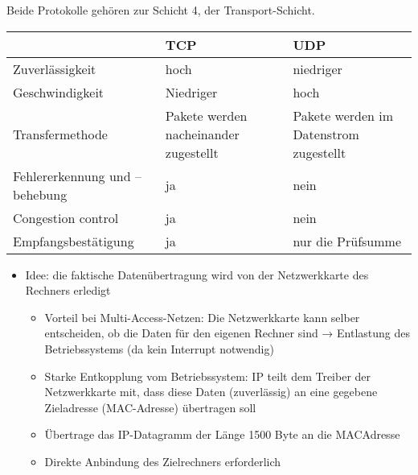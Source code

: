 Beide Protokolle gehören zur Schicht 4, der Transport-Schicht.
\bigbreak
\begin{tabularx}{\textwidth}{|X|X|X|}
    \hline
    & TCP & UDP \tabularnewline
    \hline
    Zuverlässigkeit & hoch & niedriger \tabularnewline
    \hline
    Geschwindigkeit & Niedriger & hoch \tabularnewline
    \hline
    Transfermethode & Pakete werden nacheinander zugestellt & Pakete werden im Datenstrom zugestellt \tabularnewline
    \hline
    Fehlererkennung und – behebung & ja & nein \tabularnewline
    \hline
    Congestion control & ja & nein \tabularnewline
    \hline
    Empfangsbestätigung & ja & nur die Prüfsumme \tabularnewline
    \hline
\end{tabularx}

\begin{itemize}
    \item Idee: die faktische Datenübertragung wird von der Netzwerkkarte des Rechners erledigt
    \begin{itemize}
        \item Vorteil bei Multi-Access-Netzen: Die Netzwerkkarte kann selber entscheiden, ob die Daten für den eigenen Rechner sind
        → Entlastung des Betriebssystems (da kein Interrupt notwendig)
        \item Starke Entkopplung vom Betriebssystem: IP teilt dem Treiber der Netzwerkkarte mit, dass diese Daten (zuverlässig) an eine gegebene Zieladresse (MAC-Adresse) übertragen soll
        \item Übertrage das IP-Datagramm der Länge 1500 Byte an die MACAdresse
        \item Direkte Anbindung des Zielrechners erforderlich
    \end{itemize}
\end{itemize}
